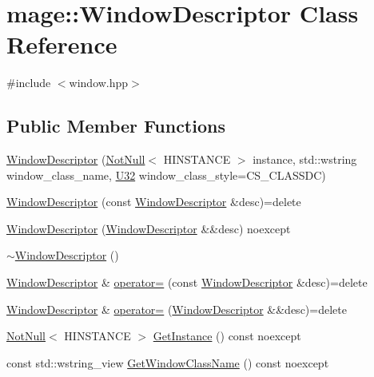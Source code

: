 \hypertarget{classmage_1_1_window_descriptor}{}\section{mage\+:\+:Window\+Descriptor Class Reference}
\label{classmage_1_1_window_descriptor}


{\ttfamily \#include $<$window.\+hpp$>$}

\subsection*{Public Member Functions}
\begin{DoxyCompactItemize}
\item 
\mbox{\hyperlink{classmage_1_1_window_descriptor_a3c0f82aaea1ac634e0001e2bdf1484ab}{Window\+Descriptor}} (\mbox{\hyperlink{namespacemage_a8769f9d670d6b585ea306cb1062af94b}{Not\+Null}}$<$ H\+I\+N\+S\+T\+A\+N\+CE $>$ instance, std\+::wstring window\+\_\+class\+\_\+name, \mbox{\hyperlink{namespacemage_aa5d6eaabaac3cdd01873d6a3d27e90f3}{U32}} window\+\_\+class\+\_\+style=C\+S\+\_\+\+C\+L\+A\+S\+S\+DC)
\item 
\mbox{\hyperlink{classmage_1_1_window_descriptor_a98059ff14fd8c0e808d1a15dbf9b6bb8}{Window\+Descriptor}} (const \mbox{\hyperlink{classmage_1_1_window_descriptor}{Window\+Descriptor}} \&desc)=delete
\item 
\mbox{\hyperlink{classmage_1_1_window_descriptor_a9c63bbf4c794efd0e6dbc067d3378ccd}{Window\+Descriptor}} (\mbox{\hyperlink{classmage_1_1_window_descriptor}{Window\+Descriptor}} \&\&desc) noexcept
\item 
\mbox{\hyperlink{classmage_1_1_window_descriptor_ac73160dd1e90b9acf819164b774d5709}{$\sim$\+Window\+Descriptor}} ()
\item 
\mbox{\hyperlink{classmage_1_1_window_descriptor}{Window\+Descriptor}} \& \mbox{\hyperlink{classmage_1_1_window_descriptor_a539433423c905e8b45d5bc9d895ee79c}{operator=}} (const \mbox{\hyperlink{classmage_1_1_window_descriptor}{Window\+Descriptor}} \&desc)=delete
\item 
\mbox{\hyperlink{classmage_1_1_window_descriptor}{Window\+Descriptor}} \& \mbox{\hyperlink{classmage_1_1_window_descriptor_a314e45a7cac3a68caefd8b05ddc86040}{operator=}} (\mbox{\hyperlink{classmage_1_1_window_descriptor}{Window\+Descriptor}} \&\&desc)=delete
\item 
\mbox{\hyperlink{namespacemage_a8769f9d670d6b585ea306cb1062af94b}{Not\+Null}}$<$ H\+I\+N\+S\+T\+A\+N\+CE $>$ \mbox{\hyperlink{classmage_1_1_window_descriptor_a09423845e3cc6bd451e280a92222ca14}{Get\+Instance}} () const noexcept
\item 
const std\+::wstring\+\_\+view \mbox{\hyperlink{classmage_1_1_window_descriptor_af89d025d126a20c8695f00271035692d}{Get\+Window\+Class\+Name}} () const noexcept
\end{DoxyCompactItemize}
